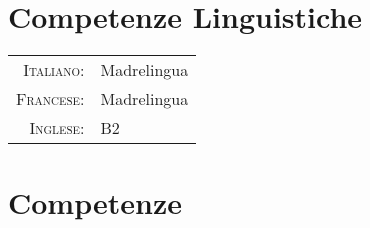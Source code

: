 \documentclass[a4paper,10pt]{article} %
\begin{document}

%
%


\section{Competenze Linguistiche}

\begin{tabular}{rl}

\textsc{Italiano:} & Madrelingua\\

\textsc{Francese:} & Madrelingua\\

\textsc{Inglese:} & B2\\
\end{tabular}


\section{Competenze}
\end{document}

